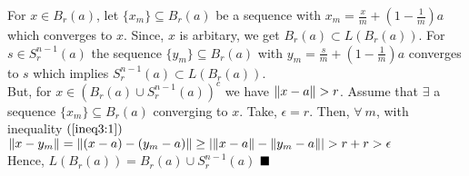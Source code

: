 For $ x \in B_{r}(a) $, let $ \{x_m\} \subseteq B_r(a) $  be a sequence with $ x_m = \frac{x}{m}+\left(1-\frac{1}{m}\right)a $ which converges to $ x $. Since, $ x $ is arbitary, we get $ B_r(a) \subset L(B_r(a)) $. For $ s \in S^{n-1}_r(a) $ the sequence $ \{y_m\} \subseteq B_r(a) $ with $ y_m = \frac{s}{m}+\left(1-\frac{1}{m}\right)a $ converges to $ s $ which implies $  S^{n-1}_r(a) \subset L(B_r(a))$. 
\\
But, for $ x \in (B_r(a) \cup S^{n-1}_r(a))^c $ we have $ \norm{x-a} > r $. Assume that $ \exists $ a sequence $ \{x_m\} \subseteq B_r(a) $ converging to $ x $. Take, $ \epsilon = r $. Then, $ \forall \ m$, with inequality $ (\ref{ineq3:1}) $ \\ 
$\norm{x-y_m} = \norm{(x-a)-(y_m-a)} \geq \left| {\norm{x-a} - \norm{y_m-a}} \right| > r + r > \epsilon $ \Contra
\\
Hence, $L(B_r(a)) = B_r(a) \cup S^{n-1}_r(a)$ $ \QEd $ 